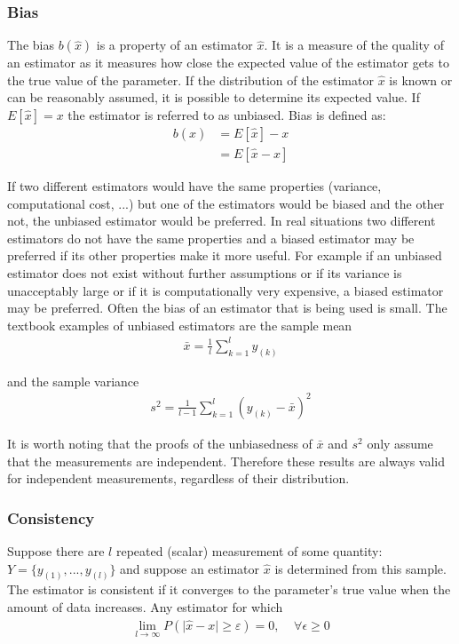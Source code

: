 \documentclass[report,12pt]{report}
\begin{document}
\subsubsection*{Bias}
The bias $b(\hat x)$ is a property of an estimator $\hat x$. It is a measure of the quality of an estimator as it measures how close the expected value of the estimator gets to the true value of the parameter. If the distribution of the estimator $\hat x$ is known or can be reasonably assumed, it is possible to determine its expected value. If $E[\hat x] = x$ the estimator is referred to as unbiased. Bias is defined as:
\begin{align}
	b(\hat x) &= E[\hat x] - x
	\nonumber\\
	&= E[\hat x - x]
	\label{eq:bias}
\end{align}

If two different estimators would have the same properties (variance, computational cost, ...) but one of the estimators would be biased and the other not, the unbiased estimator would be preferred. In real situations two different estimators do not have the same properties and a biased estimator may be preferred if its other properties make it more useful. For example if an unbiased estimator does not exist without further assumptions or if its variance is unacceptably large or if it is computationally very expensive, a biased estimator may be preferred. Often the bias of an estimator that is being used is small. The textbook examples of unbiased estimators are the sample mean
\begin{align}
	\bar x = \frac{1}{l}\sum_{k=1}^l y_{(k)}
	\label{eq:samplemean}
\end{align}

and the sample variance
\begin{align}
	s^2 = \frac{1}{l-1}\sum_{k=1}^l \left( y_{(k)} - \bar x \right)^2
\end{align}

It is worth noting that the proofs \cite{Watkins} of the unbiasedness of $\bar x$ and $s^2$ only assume that the measurements are independent. Therefore these results are always valid for independent measurements, regardless of their distribution.




\subsubsection*{Consistency}
Suppose there are $l$ repeated (scalar) measurement of some quantity: $Y = \{y_{(1)}, ..., y_{(l)}\}$ and suppose an estimator $\hat x$ is determined from this sample. The estimator is consistent if it converges to the parameter's true value when the amount of data increases. Any estimator for which
\begin{align}
	\lim_{l\to\infty} P\left( \mid \hat x - x \mid \geq \varepsilon \right) = 0,\ \ \ \ \
	\forall \epsilon \geq 0 
\end{align}
\end{document}

